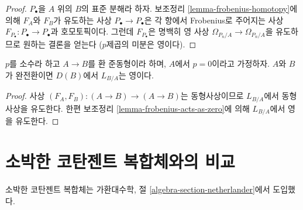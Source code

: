 \begin{proof}
$P_\bullet$을 $A$ 위의 $B$의 표준 분해라 하자. 보조정리
\ref{lemma-frobenius-homotopy}에 의해 $F_A$와 $F_B$가 유도하는 사상
$P_\bullet\to P_\bullet$은 각 항에서 Frobenius로 주어지는 사상
$F_{P_\bullet}:P_\bullet\to P_\bullet$과 호모토픽이다. 그런데
$F_{P_\bullet}$은 명백히 영 사상
$\Omega_{P_n/A}\to\Omega_{P_n/A}$을 유도하므로 원하는 결론을 얻는다
($p$제곱의 미분은 영이다).
\end{proof}

\begin{lemma}
\label{lemma-perfect-zero}
$p$를 소수라 하고 $A\to B$를 환 준동형이라 하며, $A$에서 $p=0$이라고
가정하자. $A$와 $B$가 완전환이면 $D(B)$에서 $L_{B/A}$는 영이다.
\end{lemma}

\begin{proof}
사상 $(F_A,F_B):(A\to B)\to(A\to B)$는 동형사상이므로 $L_{B/A}$에서
동형사상을 유도한다. 한편 보조정리
\ref{lemma-frobenius-acts-as-zero}에 의해 $L_{B/A}$에서 영을 유도한다.
\end{proof}





\section{소박한 코탄젠트 복합체와의 비교}
\label{section-surjections}

\noindent
소박한 코탄젠트 복합체는 가환대수학, 절
\ref{algebra-section-netherlander}에서 도입했다.


